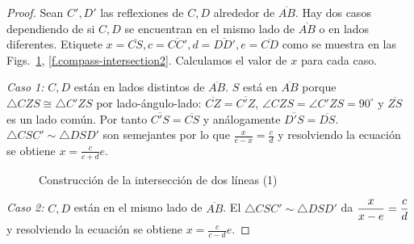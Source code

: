 \begin{proof}
Sean $C',D'$ las reflexiones de $C,D$ alrededor de $\overline{AB}$.
Hay dos casos dependiendo de si $C,D$ se encuentran en el mismo lado de $\overline{AB}$ o en lados diferentes. Etiquete $x=\overline{CS}, c=\overline{CC'}, d=\overline{DD'}, e=\overline{CD}$ como se muestra en las Figs.~\ref{f.compass-intersection1}, \ref{f.compass-intersection2}. Calculamos el valor de $x$ para cada caso.

\textit{Caso 1:}
$C,D$ están en lados distintos de $\overline{AB}$.
$S$ está en $\overline{AB}$ porque $\triangle CZS\cong \triangle C'ZS$ por lado-ángulo-lado: $\overline{CZ}=\overline{C'Z}$, $\angle CZS=\angle C'ZS=90^\circ$ y $\overline{ZS}$ es un lado común. Por tanto $\overline{C'S}=\overline{CS}$ y análogamente $\overline{D'S}=\overline{DS}$. $\triangle CSC'\sim\triangle DSD'$ son semejantes por lo que $\displaystyle\frac{x}{e-x} = \displaystyle\frac{c}{d}$ y resolviendo la ecuación se obtiene $x=\displaystyle\frac{c}{c+d}e$.

\begin{figure}[ht]
\begin{center}
\end{center}
\caption{Construcción de la intersección de dos líneas (1)}\label{f.compass-intersection1}
\end{figure}

\textit{Caso 2:}
$C,D$ están en el mismo lado de $\overline{AB}$. El $\triangle CSC'\sim\triangle DSD'$ da $\displaystyle\frac{x}{x-e}=\frac{c}{d}\displaystyle$ y resolviendo la ecuación se obtiene $x=\displaystyle\frac{c}{c-d}e$.


\end{proof}
